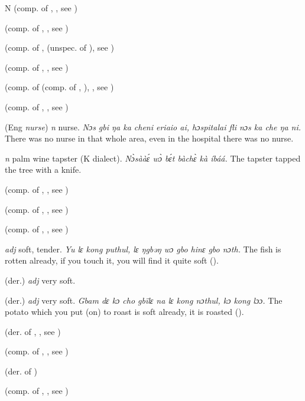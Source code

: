 \begin{letter}{N}
 (comp. of , , see ) 

 (comp. of , , see ) 

 (comp. of ,  (unspec. of ), see ) 

 (comp. of , , see )

 (comp. of  (comp. of , ), , see ) 

 (comp. of , , see ) 

 (Eng \textit{nurse}) \textit{n} nurse. \textit{Nɔs gbi ŋa ka cheni eriaio ai, hɔspitalai fli nɔs ka che ŋa ni.} There was no nurse in that whole area, even in the hospital there was no nurse.

 \textit{n} palm wine tapster (K dialect). \textit{Nɔ̀sààɛ́ wɔ̀ bɛ́t bàchɛ̀ kà íbáá.} The tapster tapped the tree with a knife.

 (comp. of , , see ) 

 (comp. of , , see ) 

 (comp. of , , see ) 

 \textit{adj} soft, tender. \textit{Yu lɛ kong puthul, lɛ ŋgbəŋ wɔ gbo hinɛ gbo nɔth.} The fish is rotten already, if you touch it, you will find it quite soft (\citealt{Pichl1967}).

 (der.) \textit{adj} very soft.

 (der.) \textit{adj} very soft. \textit{Gbam dɛ kɔ cho gbïlɛ na lɛ kong nɔthul, kɔ kong lɔɔ.} The potato which you put (on) to roast is soft already, it is roasted (\citealt{Pichl1967}).

 (der. of , , see ) 

 (comp. of , , see ) 

 (der. of ) 

 (comp. of , , see ) 


\end{letter}
